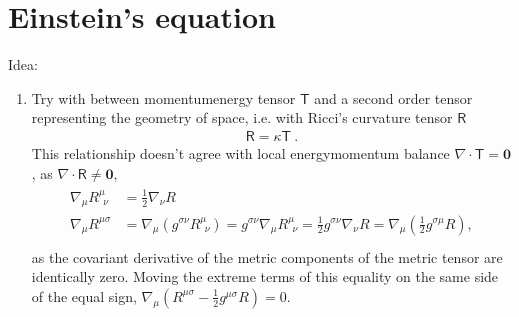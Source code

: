 \documentclass[letterpaper,10pt,english]{jupyterBook}
\begin{document}
\section{Einstein’s equation}
\label{\detokenize{ch/relativity-general/einstein-equation:einstein-s-equation}}\label{\detokenize{ch/relativity-general/einstein-equation:relativity-general-notes-einstein-equation}}\label{\detokenize{ch/relativity-general/einstein-equation::doc}}
\sphinxAtStartPar
Idea:
\begin{enumerate}
%
\item {} 
\sphinxAtStartPar
Try with  between momentum\sphinxhyphen{}energy tensor \(\mathsf{T}\) and a second order tensor representing the geometry of space, i.e.  with Ricci’s curvature tensor \(\mathsf{R}\)
\begin{equation*}
\begin{split}\mathsf{R} = \kappa \mathsf{T} \ .\end{split}
\end{equation*}
\sphinxAtStartPar
{} This relationship doesn’t agree with local energy\sphinxhyphen{}momentum balance \(\nabla \cdot \mathsf{T} = \mathbf{0}\), as \(\nabla \cdot \mathsf{R} \ne \mathbf{0}\),
\begin{equation*}
\begin{split}\begin{aligned}
     \nabla_{\mu} R^{\mu}_{\ \ \nu} & = \frac{1}{2} \nabla_{\nu} R \\
     \nabla_{\mu} R^{\mu \sigma} & = \nabla_{\mu} \left( g^{\sigma \nu} R^{\mu}_{\ \ \nu} \right) = g^{\sigma \nu} \nabla_{\mu} R^{\mu}_{\ \ \nu} = \frac{1}{2}  g^{\sigma \nu }\nabla_{\nu} R = \nabla_{\mu} \left( \frac{1}{2} g^{\sigma \mu} R \right) , \\
   \end{aligned}\end{split}
\end{equation*}
\sphinxAtStartPar
as the covariant derivative of the metric components of the metric tensor are identically zero. Moving the extreme terms of this equality on the same side of the equal sign, \(\nabla_{\mu} \left( R^{\mu \sigma} - \frac{1}{2} g^{\mu \sigma} R \right) = 0\).

\end{enumerate}
\end{document}
